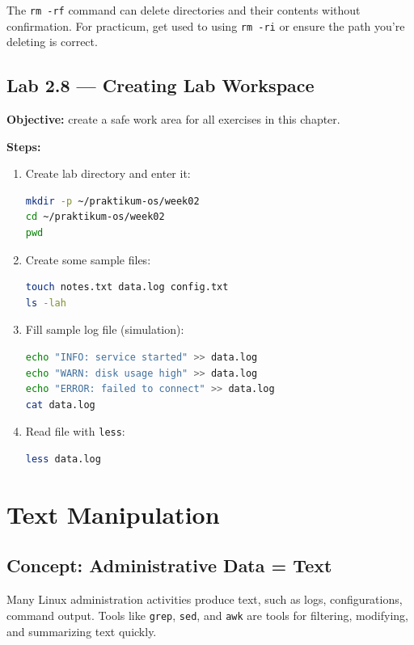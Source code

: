 \begin{warningbox}
The \texttt{rm -rf} command can delete directories and their contents without confirmation. For practicum, get used to using \texttt{rm -ri}
or ensure the path you're deleting is correct.
\end{warningbox}

\subsection*{Lab 2.8 --- Creating Lab Workspace}
\textbf{Objective:} create a safe work area for all exercises in this chapter.

\textbf{Steps:}
\begin{enumerate}
    \item Create lab directory and enter it:
\begin{lstlisting}[language=bash, caption={Create lab workspace}]
mkdir -p ~/praktikum-os/week02
cd ~/praktikum-os/week02
pwd
\end{lstlisting}

    \item Create some sample files:
\begin{lstlisting}[language=bash, caption={Create sample files}]
touch notes.txt data.log config.txt
ls -lah
\end{lstlisting}

    \item Fill sample log file (simulation):
\begin{lstlisting}[language=bash, caption={Fill sample log file}]
echo "INFO: service started" >> data.log
echo "WARN: disk usage high" >> data.log
echo "ERROR: failed to connect" >> data.log
cat data.log
\end{lstlisting}

    \item Read file with \texttt{less}:
\begin{lstlisting}[language=bash, caption={Read file with less}]
less data.log
\end{lstlisting}
\end{enumerate}

\section{Text Manipulation}
\label{sec:text-manipulation}

\subsection*{Concept: Administrative Data = Text}
Many Linux administration activities produce text, such as logs, configurations, command output. Tools like \texttt{grep}, \texttt{sed}, and \texttt{awk}
are tools for filtering, modifying, and summarizing text quickly.

